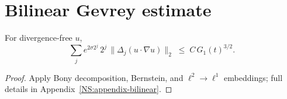 \section{Bilinear Gevrey estimate}\label{NS:bilinear}

\begin{lemma}\label{lem:bilinear}
For divergence-free $u$,
\[
\sum_{j} e^{2\sigma 2^{j}}\,
        2^{j}\,\|\Delta_{j}(u\!\cdot\!\nabla u)\|_{2}
     \;\le\;
     C\,G_{1}(t)^{3/2}.
\]
\end{lemma}

\begin{proof}
Apply Bony decomposition, Bernstein, and
$\ell^{2}\!\to\ell^{1}$ embeddings; full details in
Appendix~\ref{NS:appendix-bilinear}.
\end{proof} 